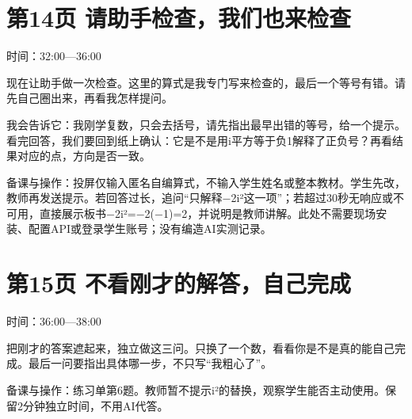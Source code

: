 \documentclass[UTF8,a4paper,11pt,fontset=fandol]{ctexart}
\begin{document}
\par\noindent\begin{minipage}{\linewidth}

\section*{第14页 请助手检查，我们也来检查}

时间：32:00—36:00

现在让助手做一次检查。这里的算式是我专门写来检查的，最后一个等号有错。请先自己圈出来，再看我怎样提问。

我会告诉它：我刚学复数，只会去括号，请先指出最早出错的等号，给一个提示。看完回答，我们要回到纸上确认：它是不是用i平方等于负1解释了正负号？再看结果对应的点，方向是否一致。

{\small\color{black!65}备课与操作：投屏仅输入匿名自编算式，不输入学生姓名或整本教材。学生先改，教师再发送提示。若回答过长，追问“只解释−2i²这一项”；若超过30秒无响应或不可用，直接展示板书−2i²=−2(−1)=2，并说明是教师讲解。此处不需要现场安装、配置API或登录学生账号；没有编造AI实测记录。}

\end{minipage}\par\vspace{3mm}

\par\noindent\begin{minipage}{\linewidth}

\section*{第15页 不看刚才的解答，自己完成}

时间：36:00—38:00

把刚才的答案遮起来，独立做这三问。只换了一个数，看看你是不是真的能自己完成。最后一问要指出具体哪一步，不只写“我粗心了”。

{\small\color{black!65}备课与操作：练习单第6题。教师暂不提示i²的替换，观察学生能否主动使用。保留2分钟独立时间，不用AI代答。}

\end{minipage}\par\vspace{3mm}
\end{document}
